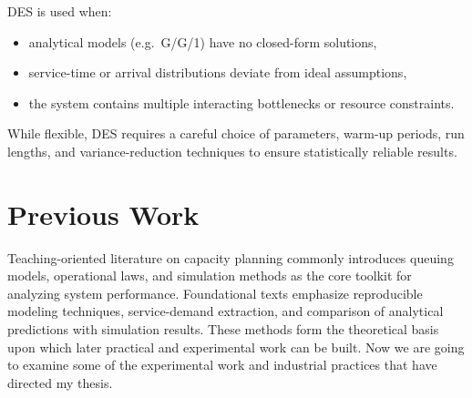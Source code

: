 DES is used when:

\begin{itemize}
    \item analytical models (e.g.\ G/G/1) have no closed-form solutions,
    \item service-time or arrival distributions deviate from ideal assumptions,
    \item the system contains multiple interacting bottlenecks or
          resource constraints.
\end{itemize}

While flexible, DES requires a careful choice of parameters, warm-up
periods, run lengths, and variance-reduction techniques to ensure
statistically reliable results.

\section{Previous Work}

Teaching-oriented literature on capacity planning commonly introduces
queuing models, operational laws, and simulation methods as the core
toolkit for analyzing system performance. Foundational texts emphasize
reproducible modeling techniques, service-demand extraction, and
comparison of analytical predictions with simulation results. These
methods form the theoretical basis upon which later practical and
experimental work can be built. Now we are going to examine some of the experimental work and industrial practices that have directed my thesis.

